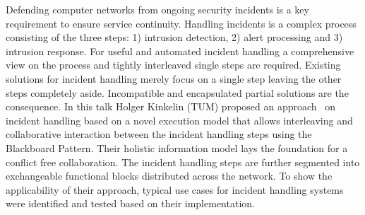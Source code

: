 Defending computer networks from ongoing security incidents is a key
requirement to ensure service continuity. Handling incidents is a complex
process consisting of the three steps: 1) intrusion detection, 2) alert
processing and 3) intrusion response. For useful and automated incident
handling a comprehensive view on the process and tightly interleaved single
steps are required. Existing solutions for incident handling merely focus on a
single step leaving the other steps completely aside. Incompatible and
encapsulated partial solutions are the consequence. In this talk Holger
Kinkelin (TUM) proposed an approach~\cite{herold:iscs:2016} on incident
handling based on a novel execution model that allows interleaving and
collaborative interaction between the incident handling steps using the
Blackboard Pattern. Their holistic information model lays the foundation for a
conflict free collaboration. The incident handling steps are further segmented
into exchangeable functional blocks distributed across the network. To show
the applicability of their approach, typical use cases for incident handling
systems were identified and tested based on their implementation.
